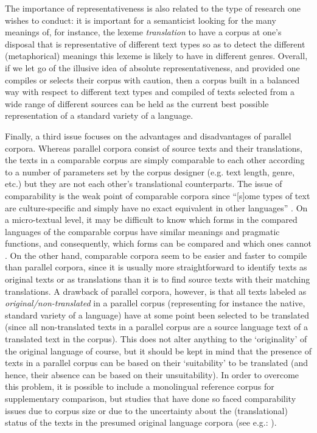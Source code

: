 The importance of representativeness is also related to the type of research one wishes to conduct: it is important for a semanticist looking for the many meanings of, for instance, the lexeme \textit{translation} to have a corpus at one’s disposal that is representative of different text types so as to detect the different (metaphorical) meanings this lexeme is likely to have in different genres. Overall, if we let go of the illusive idea of absolute representativeness, and provided one compiles or selects their corpus with caution, then a corpus built in a balanced way with respect to different text types and compiled of texts selected from a wide range of different sources can be held as the current best possible representation of a standard variety of a language.

Finally, a third issue focuses on the advantages and disadvantages of parallel corpora. Whereas parallel corpora consist of source texts and their translations, the texts in a comparable corpus are simply comparable to each other according to a number of parameters set by the corpus designer (e.g. text length, genre, etc.) but they are not each other’s translational counterparts. The issue of comparability is the weak point of comparable corpora since “[s]ome types of text are culture-specific and simply have no exact equivalent in other languages” \citep[19]{granger_corpus_2003}. On a micro-textual level, it may be difficult to know which forms in the compared languages of the comparable corpus have similar meanings and pragmatic functions, and consequently, which forms can be compared and which ones cannot \citep[5]{johansson_translational_1998}. On the other hand, comparable corpora seem to be easier and faster to compile than parallel corpora, since it is usually more straightforward to identify texts as original texts or as translations than it is to find source texts with their matching translations. A drawback of parallel corpora, however, is that all texts labeled as \textit{original/non-translated} in a parallel corpus (representing for instance the native, standard variety of a language) have at some point been selected to be translated (since all non-translated texts in a parallel corpus are a source language text of a translated text in the corpus). This does not alter anything to the ‘originality’ of the original language of course, but it should be kept in mind that the presence of texts in a parallel corpus can be based on their ‘suitability’ to be translated (and hence, their absence can be based on their unsuitability). In order to overcome this problem, it is possible to include a monolingual reference corpus for supplementary comparison, but studies that have done so faced comparability issues due to corpus size or due to the uncertainty about the (translational) status of the texts in the presumed original language corpora (see e.g.: \citealt{musolff_conceptual_2014}).

